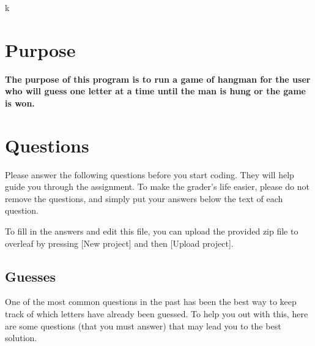 \documentclass{article}
\title{\ASSIGNMENT}
\author{\NAME}
\date{\CLASS}
\begin{document}
\pagestyle{fancy}
\fancyfoot{}
\fancyhead{}
\fancyfoot[L]{\ASSIGNMENT\ -- \CLASS\ -- \NAME}
\fancyfoot[R]{\thepage}

\maketitle
k


\section{Purpose}
\textbf{
The purpose of this program is to run a game of hangman for the user who will guess one letter at a time until the man is hung or the game is won.
}   
\section{Questions}
Please answer the following questions before you start coding. They will help guide you through the assignment. To make the grader's life easier, please do not remove the questions, and simply put your answers below the text of each question. 

To fill in the answers and edit this file, you can upload the provided zip file to overleaf by pressing [New project] and then [Upload project]. 

\subsection{Guesses}
One of the most common questions in the past has been the best way to keep track of which letters have already been guessed. To help you out with this, here are some questions (that you must answer) that may lead you to the best solution. 
\end{document}

